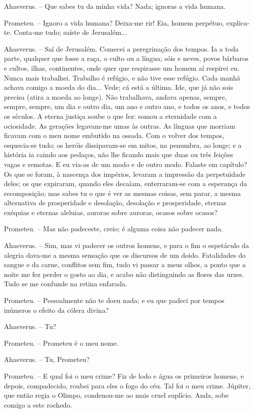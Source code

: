 Ahasverus. -- Que sabes tu da minha vida? Nada; ignoras a vida humana.

Prometeu. -- Ignoro a vida humana? Deixa-me rir! Eia, homem perpétuo,
explica-te. Conta-me tudo; saíste de Jerusalém...

Ahasverus. -- Saí de Jerusalém. Comecei a peregrinação dos tempos. Ia a
toda parte, qualquer que fosse a raça, o culto ou a língua; sóis e
neves, povos bárbaros e cultos, ilhas, continentes, onde quer que
respirasse um homem aí respirei eu. Nunca mais trabalhei. Trabalho é
refúgio, e não tive esse refúgio. Cada manhã achava comigo a moeda do
dia... Vede; cá está a última. Ide, que já não sois precisa (atira a
moeda ao longe). Não trabalhava, andava apenas, sempre, sempre, sempre,
um dia e outro dia, um ano e outro ano, e todos os anos, e todos os
séculos. A eterna justiça soube o que fez: somou a eternidade com a
ociosidade. As gerações legavam-me umas às outras. As línguas que
morriam ficavam com o meu nome embutido na ossada. Com o volver dos
tempos, esquecia-se tudo; os heróis dissipavam-se em mitos, na penumbra,
ao longe; e a história ia caindo aos pedaços, não lhe ficando mais que
duas ou três feições vagas e remotas. E eu via-as de um modo e de outro
modo. Falaste em capítulo? Os que se foram, à nascença dos impérios,
levaram a impressão da perpetuidade deles; os que expiraram, quando eles
decaíam, enterraram-se com a esperança da recomposição; mas sabes tu o
que é ver as mesmas coisas, sem parar, a mesma alternativa de
prosperidade e desolação, desolação e prosperidade, eternas exéquias e
eternas aleluias, auroras sobre auroras, ocasos sobre ocasos?

Prometeu. -- Mas não padeceste, creio; é alguma coisa não padecer nada.

Ahasverus. -- Sim, mas vi padecer os outros homens, e para o fim o
espetáculo da alegria dava-me a mesma sensação que os discursos de um
doido. Fatalidades do sangue e da carne, conflitos sem fim, tudo vi
passar a meus olhos, a ponto que a noite me fez perder o gosto ao dia, e
acabo não distinguindo as flores das urzes. Tudo se me confunde na
retina enfarada.

Prometeu. -- Pessoalmente não te doeu nada; e eu que padeci por tempos
inúmeros o efeito da cólera divina?

Ahasverus. -- Tu?

Prometeu. -- Prometeu é o meu nome.

Ahasverus. -- Tu, Prometeu?

Prometeu. -- E qual foi o meu crime? Fiz de lodo e água os primeiros
homens, e depois, compadecido, roubei para eles o fogo do céu. Tal foi o
meu crime. Júpiter, que então regia o Olimpo, condenou-me ao mais cruel
suplício. Anda, sobe comigo a este rochedo.

